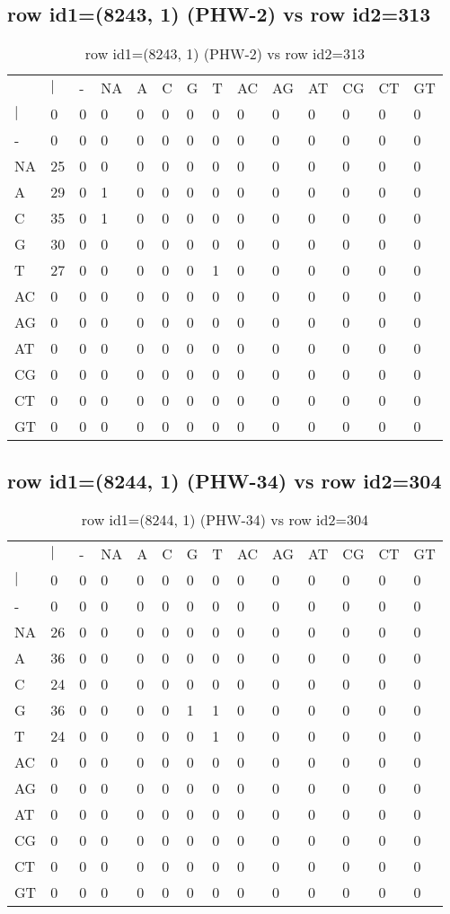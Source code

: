 \subsection{row id1=(8243, 1) (PHW-2) vs row id2=313}
\begin{center}
\begin{longtable}{|l|l|l|l|l|l|l|l|l|l|l|l|l|l|}
\caption{row id1=(8243, 1) (PHW-2) vs row id2=313} \label{table_dm182}\\
\hline
\\
\hline
&$|$&-&NA&A&C&G&T&AC&AG&AT&CG&CT&GT\\
$|$&0&0&0&0&0&0&0&0&0&0&0&0&0\\
-&0&0&0&0&0&0&0&0&0&0&0&0&0\\
NA&25&0&0&0&0&0&0&0&0&0&0&0&0\\
A&29&0&1&0&0&0&0&0&0&0&0&0&0\\
C&35&0&1&0&0&0&0&0&0&0&0&0&0\\
G&30&0&0&0&0&0&0&0&0&0&0&0&0\\
T&27&0&0&0&0&0&1&0&0&0&0&0&0\\
AC&0&0&0&0&0&0&0&0&0&0&0&0&0\\
AG&0&0&0&0&0&0&0&0&0&0&0&0&0\\
AT&0&0&0&0&0&0&0&0&0&0&0&0&0\\
CG&0&0&0&0&0&0&0&0&0&0&0&0&0\\
CT&0&0&0&0&0&0&0&0&0&0&0&0&0\\
GT&0&0&0&0&0&0&0&0&0&0&0&0&0\\
\hline
\end{longtable}
\end{center}

\subsection{row id1=(8244, 1) (PHW-34) vs row id2=304}
\begin{center}
\begin{longtable}{|l|l|l|l|l|l|l|l|l|l|l|l|l|l|}
\caption{row id1=(8244, 1) (PHW-34) vs row id2=304} \label{table_dm184}\\
\hline
\\
\hline
&$|$&-&NA&A&C&G&T&AC&AG&AT&CG&CT&GT\\
$|$&0&0&0&0&0&0&0&0&0&0&0&0&0\\
-&0&0&0&0&0&0&0&0&0&0&0&0&0\\
NA&26&0&0&0&0&0&0&0&0&0&0&0&0\\
A&36&0&0&0&0&0&0&0&0&0&0&0&0\\
C&24&0&0&0&0&0&0&0&0&0&0&0&0\\
G&36&0&0&0&0&1&1&0&0&0&0&0&0\\
T&24&0&0&0&0&0&1&0&0&0&0&0&0\\
AC&0&0&0&0&0&0&0&0&0&0&0&0&0\\
AG&0&0&0&0&0&0&0&0&0&0&0&0&0\\
AT&0&0&0&0&0&0&0&0&0&0&0&0&0\\
CG&0&0&0&0&0&0&0&0&0&0&0&0&0\\
CT&0&0&0&0&0&0&0&0&0&0&0&0&0\\
GT&0&0&0&0&0&0&0&0&0&0&0&0&0\\
\hline
\end{longtable}
\end{center}

